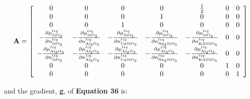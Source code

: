 \documentclass[11pt, titlepage, twoside]{article}
\begin{document}
\begin{MPEquation}[!ht]
\begin{equation}
{\bf{A}} = \left[ {\begin{array}{*{20}{c}}
0&0&0&0&{\frac{1}{2}}&0&0\\
0&0&0&1&0&0&0\\
0&0&1&0&0&0&0\\
{ - \frac{{\partial \mu _{{\rm{Si}}{{\rm{O}}_2}}^{liq}}}{{\partial n_{{\rm{Si}}{{\rm{O}}_2}}^{liq}}}}&{ - \frac{{\partial \mu _{{\rm{Si}}{{\rm{O}}_2}}^{liq}}}{{\partial n_{{\rm{A}}{{\rm{l}}_2}{{\rm{O}}_3}}^{liq}}}}&{ - \frac{{\partial \mu _{{\rm{Si}}{{\rm{O}}_2}}^{liq}}}{{\partial n_{{\rm{CaSi}}{{\rm{O}}_3}}^{liq}}}}&{ - \frac{{\partial \mu _{{\rm{Si}}{{\rm{O}}_2}}^{liq}}}{{\partial n_{{\rm{N}}{{\rm{a}}_2}{\rm{Si}}{{\rm{O}}_3}}^{liq}}}}&{ - \frac{{\partial \mu _{{\rm{Si}}{{\rm{O}}_2}}^{liq}}}{{\partial n_{{\rm{KAlSi}}{{\rm{O}}_4}}^{liq}}}}&0&0\\
{ - \frac{{\partial \mu _{{\rm{A}}{{\rm{l}}_2}{{\rm{O}}_3}}^{liq}}}{{\partial n_{{\rm{Si}}{{\rm{O}}_2}}^{liq}}}}&{ - \frac{{\partial \mu _{{\rm{A}}{{\rm{l}}_2}{{\rm{O}}_3}}^{liq}}}{{\partial n_{{\rm{A}}{{\rm{l}}_2}{{\rm{O}}_3}}^{liq}}}}&{ - \frac{{\partial \mu _{{\rm{A}}{{\rm{l}}_2}{{\rm{O}}_3}}^{liq}}}{{\partial n_{{\rm{CaSi}}{{\rm{O}}_3}}^{liq}}}}&{ - \frac{{\partial \mu _{{\rm{A}}{{\rm{l}}_2}{{\rm{O}}_3}}^{liq}}}{{\partial n_{{\rm{N}}{{\rm{a}}_2}{\rm{Si}}{{\rm{O}}_3}}^{liq}}}}&{ - \frac{{\partial \mu _{{\rm{A}}{{\rm{l}}_2}{{\rm{O}}_3}}^{liq}}}{{\partial n_{{\rm{KAlSi}}{{\rm{O}}_4}}^{liq}}}}&0&0\\
0&0&0&0&0&1&0\\
0&0&0&0&0&0&1
\end{array}} \right]
\end{equation}
\label{MPEquationElement:1C348E70-93C1-4344-C528-97A9DB82973C}
\end{MPEquation}
and the gradient, \textbf{g}, of \textbf{Equation 36} is:
\end{document}
